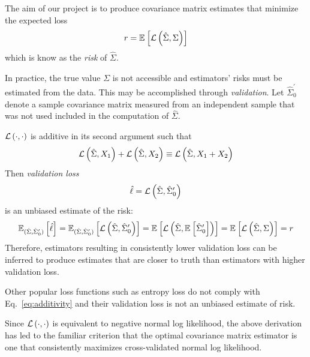 The aim of our project is to produce covariance matrix estimates that minimize the expected loss 
\begin{equation}
r = \E{\loss{\hat\Sigma, \Sigma}}
\end{equation}
which is know as the \emph{risk} of $\hat\Sigma$.

In practice, the true value $\Sigma$ is not accessible and estimators' risks must be estimated from the data.  This may be accomplished through \emph{validation}. 
Let $\hat\Sigma_0^\prime$ denote a sample covariance matrix measured from an independent sample that was not used included in the computation of $\hat\Sigma$. 

$\loss{\cdot,\cdot}$ is additive in its second argument such that
 \begin{equation}\label{eq:additivity}
 \loss{\hat\Sigma,X_1} + \loss{\hat\Sigma,X_2} \equiv \loss{\hat\Sigma,X_1+X_2}
 \end{equation}
Then \emph{validation loss}  
\begin{equation}\label{eq:validationLoss}
\hat \ell = \loss{\hat\Sigma,\hat\Sigma_0^\prime}
\end{equation}
is an unbiased estimate of the risk:
 \begin{equation}\label{eq:empiricalRisk}
\E[(\hat\Sigma, \hat\Sigma_0^\prime)] {\hat\ell} 
= \E[(\hat\Sigma, \hat\Sigma_0^\prime)]{\loss{\hat\Sigma,\hat\Sigma_0^\prime}}
= \E{\loss{\hat\Sigma,\E{\hat\Sigma_0^\prime}}}
= \E{\loss{\hat\Sigma,\Sigma}} = r
 \end{equation}
Therefore, estimators resulting in consistently lower validation loss can be inferred to produce estimates that are closer to truth than estimators with higher validation loss.

Other popular loss functions such as entropy loss do not comply with Eq.~\ref{eq:additivity} and their validation loss is not an unbiased estimate of risk.

Since $\loss{\cdot,\cdot}$ is equivalent to negative normal log likelihood, the above derivation has led to the familiar criterion that the optimal covariance matrix estimator is one that consistently maximizes cross-validated normal log likelihood.